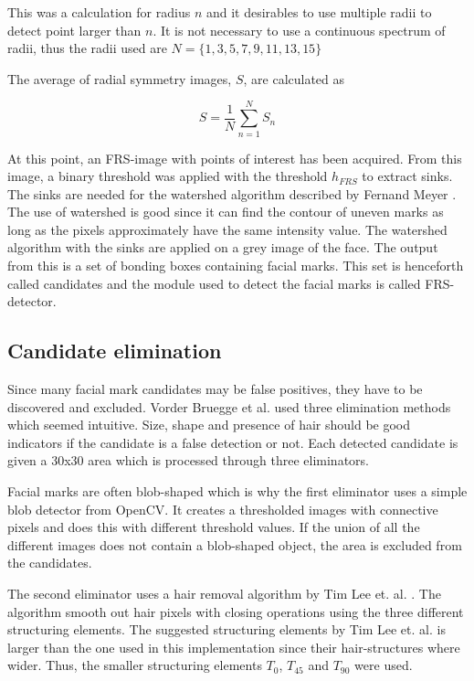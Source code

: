 This was a calculation for radius $n$ and it desirables to use multiple radii to detect point larger than $n$. It is not necessary to use a continuous spectrum of radii, thus the radii used are $N = \{1, 3, 5, 7, 9, 11, 13, 15 \}$

The average of radial symmetry images, $S$, are calculated as

\begin{equation} \label{eq:M-}
S =\frac{1}{N} \sum_{n=1}^{N} S_n
\end{equation}

At this point, an FRS-image with points of interest has been acquired. From this image, a binary threshold was applied with the threshold $h_{FRS}$ to extract sinks. The sinks are needed for the watershed algorithm described by Fernand Meyer \cite{watershed}. The use of watershed is good since it can find the contour of uneven marks as long as the pixels approximately have the same intensity value. The watershed algorithm with the sinks are applied on a grey image of the face. The output from this is a set of bonding boxes containing facial marks. This set is henceforth called candidates and the module used to detect the facial marks is called FRS-detector.

\subsection{Candidate elimination}

Since many facial mark candidates may be false positives, they have to be discovered and excluded. Vorder Bruegge et al. \cite{automatic_detector_2015} used three elimination methods which seemed intuitive. Size, shape and presence of hair should be good indicators if the candidate is a false detection or not. Each detected candidate is given a 30x30 area which is processed through three eliminators. 

Facial marks are often blob-shaped which is why the first eliminator uses a simple blob detector from OpenCV. It creates a thresholded images with connective pixels and does this with different threshold values. If the union of all the different images does not contain a blob-shaped object, the area is excluded from the candidates.   

The second eliminator uses a hair removal algorithm by Tim Lee et. al. \cite{dullrazor}. The algorithm smooth out hair pixels with closing operations using the three different structuring elements. The suggested structuring elements by Tim Lee et. al. is larger than the one used in this implementation since their hair-structures where wider. Thus, the smaller structuring elements $T_{0}$, $T_{45}$ and $T_{90}$ were used. \\

